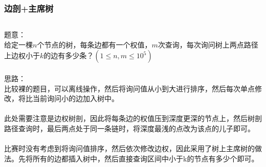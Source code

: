 \documentclass[twoside]{article}
\begin{document}
\subsubsection{边剖+主席树}
\begin{lstlisting}
\end{lstlisting}
题意：\\
给定一棵$n$个节点的树，每条边都有一个权值，$m$次查询，每次询问树上两点路径上边权小于$k$的边有多少条？$(1\leq n,m\leq 10^5)$\\
\\
思路：\\
比较裸的题目，可以离线操作，然后将询问值从小到大进行排序，然后每次单点修改，将比当前询问小的边加入树中。\\
\\
此处需要注意是边权树剖，因此将每条边的权值压到深度更深的节点上，然后树剖路径查询时，最后两点处于同一条链时，将深度最浅的点改为该点的儿子即可。\\
\\
比赛时没有考虑到将询问值排序，然后依次修改边权，因此采用了树上主席树的做法。先将所有的边都插入树中，然后直接查询区间中小于k的节点有多少个即可。\\
\end{document}
